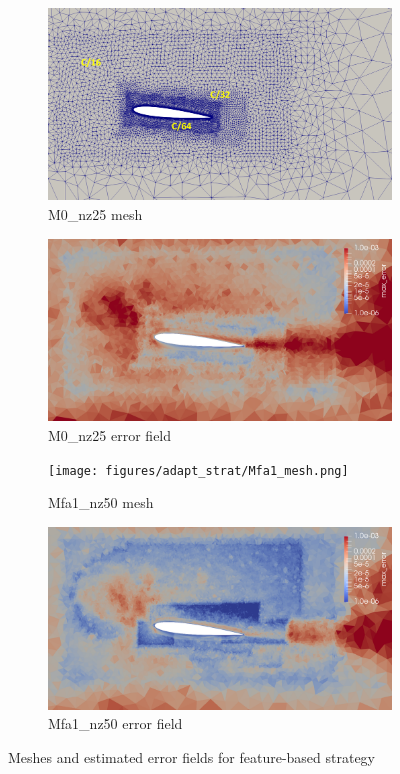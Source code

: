 \begin{figure}[H]
\centering
\begin{subfigure}[b]{0.475\textwidth}
\centering
\includegraphics[width=1\textwidth]{figures/adapt_strat/M0_mesh.png}
\caption{M0\_nz25 mesh}
\label{fig:M0_mesh_fa}
\end{subfigure}
\begin{subfigure}[b]{0.475\textwidth}
\centering
\includegraphics[width=1\textwidth]{figures/adapt_strat/M0_error.png}
\caption{M0\_nz25 error field}
\label{fig:M0_err_plot_fa}
\end{subfigure}
\begin{subfigure}[b]{0.475\textwidth}
\centering
\texttt{[image: figures/adapt\_strat/Mfa1\_mesh.png]}
\caption{Mfa1\_nz50 mesh}
\label{fig:FB_mesh}
\end{subfigure}
\begin{subfigure}[b]{0.475\textwidth}
\centering
\includegraphics[width=1\textwidth]{figures/adapt_strat/Mfa1_error.png}
\caption{Mfa1\_nz50 error field}
\label{fig:FB_error_plot}
\end{subfigure}

\caption{Meshes and estimated error fields for feature-based strategy}
\end{figure}